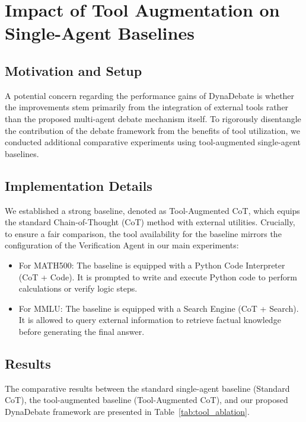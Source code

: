 \section{Impact of Tool Augmentation on Single-Agent Baselines}
\label{sec:appendix_tool_ablation}

\subsection{Motivation and Setup}
A potential concern regarding the performance gains of DynaDebate is whether the improvements stem primarily from the integration of external tools rather than the proposed multi-agent debate mechanism itself. To rigorously disentangle the contribution of the debate framework from the benefits of tool utilization, we conducted additional comparative experiments using tool-augmented single-agent baselines.

\subsection{Implementation Details}
We established a strong baseline, denoted as Tool-Augmented CoT, which equips the standard Chain-of-Thought (CoT) method with external utilities. Crucially, to ensure a fair comparison, the tool availability for the baseline mirrors the configuration of the Verification Agent in our main experiments:

\begin{itemize}
    \item For MATH500: The baseline is equipped with a Python Code Interpreter (CoT + Code). It is prompted to write and execute Python code to perform calculations or verify logic steps.
    \item For MMLU: The baseline is equipped with a Search Engine (CoT + Search). It is allowed to query external information to retrieve factual knowledge before generating the final answer.
\end{itemize}


\subsection{Results}
The comparative results between the standard single-agent baseline (Standard CoT), the tool-augmented baseline (Tool-Augmented CoT), and our proposed DynaDebate framework are presented in Table~\ref{tab:tool_ablation}.

